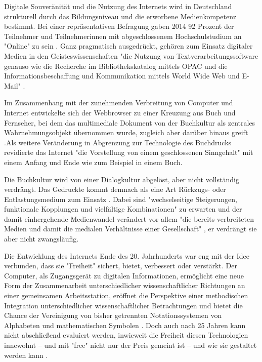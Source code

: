 Digitale Souveränität und die Nutzung des Internets wird in Deutschland strukturell durch das Bildungsniveau und die erworbene Medienkompetenz bestimmt. Bei einer repräsentativen Befragung gaben 2014 92 Prozent der Teilnehmer und Teilnehmerinnen mit abgeschlossenem Hochschulstudium an "Online" zu sein \cite{Initiative_D21_2014}. Ganz pragmatisch ausgedrückt, gehören zum Einsatz digitaler Medien in den Geisteswissenschaften "die Nutzung von Textverarbeitungssoftware genauso wie die Recherche im Bibliothekskatalog mittels OPAC und die Informationsbeschaffung und Kommunikation mittels World Wide Web und E-Mail" \cite{Naeder_2010}.

Im Zusammenhang mit der zunehmenden Verbreitung von Computer und Internet entwickelte sich der Webbrowser zu einer Kreuzung aus Buch und Fernseher, bei dem das multimediale Dokument von der Buchkultur als zentrales Wahrnehmungsobjekt übernommen wurde, zugleich aber darüber hinaus greift \cite{Warnke_2011}.Als weitere Veränderung in Abgrenzung zur Technologie des Buchdrucks revidierte das Internet "die Vorstellung von einem geschlossenen Sinngehalt" \cite{Sandbothe_2000} mit einem Anfang und Ende wie zum Beispiel in einem Buch.

Die Buchkultur wird von einer Dialogkultur abgelöst, aber nicht vollständig verdrängt. Das Gedruckte kommt demnach als eine Art Rückzugs- oder Entlastungsmedium zum Einsatz \cite{Hagner_2015}. Dabei sind "wechselseitige Steigerungen, funktionale Kopplungen und vielfältige Kombinationen" zu erwarten und der damit einhergehende Medienwandel verändert vor allem "die bereits verbreiteten Medien und damit die medialen Verhältnisse einer Gesellschaft" \cite{Koenen_1997}, er verdrängt sie aber nicht zwangsläufig.

Die Entwicklung des Internets Ende des 20. Jahrhunderts war eng mit der Idee verbunden, dass sie "Freiheit" sichert, bietet, verbessert oder verstärkt. Der Computer, als Zugangsgerät zu digitalen Informationen, ermöglicht eine neue Form der Zusammenarbeit unterschiedlicher wissenschaftlicher Richtungen an einer gemeinsamen Arbeitsstation, eröffnet die Perspektive einer methodischen Integration unterschiedlicher wissenschaftlicher Betrachtungen und bietet die Chance der Vereinigung von bisher getrennten Notationssystemen von Alphabeten und mathematischen Symbolen \cite{Kittler_2004}. Doch auch nach 25 Jahren kann nicht abschließend evaluiert werden, inwieweit die Freiheit diesen Technologien innewohnt – und mit "free" nicht nur der Preis gemeint ist  \cite{Stallman_2002} – und wie sie gestaltet werden kann \cite{Kelty_2014}.

